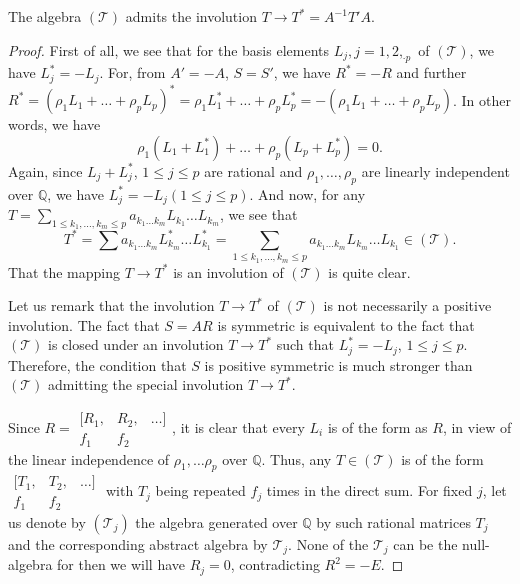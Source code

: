 \begin{proposition}
 The algebra $\mathscr{(T)}$ admits the involution $T\rightarrow
T^{\ast} = A^{-1} T' A$.
\end{proposition}

\begin{proof}
First of all, we see that for the basis elements $L_j, j =
1,2,_{\cdotp p}$ of $\mathscr{(T)}$, we have $L^{\ast}_j = -L_j$. For,
from $A'=-A$, $S=S'$, we have $R^{\ast} = -R$ and further
$R^{\ast}=(\rho_1L_1 + \ldots + \rho_p L_p)^{\ast} = \rho_1
L^{\ast}_1+\ldots + \rho_p L^{\ast}_p = - (\rho_1L_1 +
\ldots + \rho_p L_p)$. In other words, we have
$$
\rho_1 (L_1 + L^{\ast}_1) + \ldots + \rho_p(L_p+L^{\ast}_p) = 0.
$$
Again, since $L_j+L^{\ast}_j$, $1\leq j\leq p$ are rational and
$\rho_1,\ldots, \rho_p$ are linearly independent over
$\mathbb{Q}$, we have $L^{\ast}_j = -L_j (1\leq j\leq p)$. And now,
for any $T = \sum\limits_{1\leq k_1,\ldots, k_{m} \leq p} a_{k_1\ldots
  k_m} L_{k_1} \ldots L_{k_m}$, we see that
$$
T^{\ast} = \sum a_{k_1\ldots k_m} L^{\ast}_{k_m} \ldots
L^{\ast}_{k_1} = \sum_{1\leq k_1, \ldots, k_{m} \leq p}
a_{k_1\ldots k_m} L_{k_m} \ldots L_{k_1} \in \mathscr{(T)}.
$$
That the mapping $T \rightarrow T^{\ast}$ is an involution of
$\mathscr{(T)}$ is quite clear.

Let \pageoriginale us remark that the involution $T\rightarrow
T^{\ast}$ of $\mathscr{(T)}$ is not necessarily a positive
involution. The fact that $S=AR$ is symmetric is equivalent to the
fact that $\mathscr{(T)}$ is closed under an involution $T\rightarrow
T^{\ast}$ such that $L^{\ast}_j = -L_j$, $1\leq j\leq p$. Therefore,
the condition that $S$ is positive symmetric is much stronger than
$\mathscr{(T)}$ admitting the special involution $T\rightarrow
T^{\ast}$. 

Since $R= \begin{smallmatrix} [R_1, &  R_2,& \ldots]\\
f_1 & f_2 & \end{smallmatrix}$, it is clear that every $L_i$ is
of the form as $R$, in view of the linear independence of
$\rho_1,\ldots \rho_p$ over $\mathbb{Q}$. Thus, any $T \in
\mathscr{(T)}$ is of the form $\begin{smallmatrix} [T_1, &
    T_2, & \ldots]\\ f_1 & f_2 & \end{smallmatrix} $ with
$T_j$ being repeated $f_j$ times in the direct sum. For fixed $j$, let
us denote by $(\mathscr{T}_j)$ the algebra generated over $\mathbb{Q}$
by such rational matrices $T_j$ and the corresponding abstract algebra
by $\mathscr{T}_j$. None of the $\mathscr{T}_j$ can be the
null-algebra for then we will have $R_j =0$, contradicting $R^2 = -
E$.
\end{proof}

